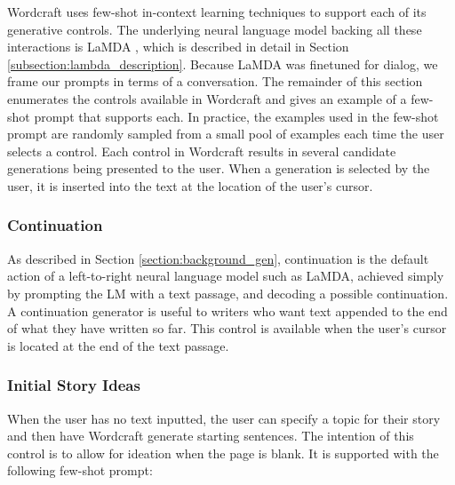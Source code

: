 Wordcraft uses few-shot in-context learning techniques \cite{brown2020language} to support each of its generative controls.
The underlying neural language model backing all these interactions is LaMDA \cite{thoppilan2022lamda}, which is described in detail in Section \ref{subsection:lambda_description}.
Because LaMDA was finetuned for dialog, we frame our prompts in terms of a conversation.
The remainder of this section enumerates the controls available in Wordcraft and gives an example of a few-shot prompt that supports each.
In practice, the examples used in the few-shot prompt are randomly sampled from a small pool of examples each time the user selects a control.
Each control in Wordcraft results in several candidate generations being presented to the user.
When a generation is selected by the user, it is inserted into the text at the location of the user's cursor.


\subsubsection{Continuation}
As described in Section \ref{section:background_gen}, continuation is the default action of a left-to-right neural language model such as LaMDA, achieved simply by prompting the LM with a text passage, and decoding a possible continuation.
A continuation generator is useful to writers who want text appended to the end of what they have written so far.
This control is available when the user's cursor is located at the end of the text passage.

\subsubsection{Initial Story Ideas}
When the user has no text inputted, the user can specify a topic for their story and then have Wordcraft generate starting sentences.
The intention of this control is to allow for ideation when the page is blank.
It is supported with the following few-shot prompt:


